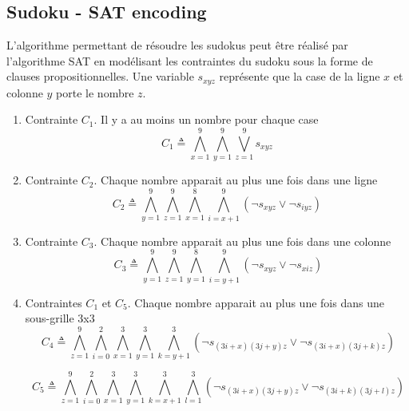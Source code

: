 \subsection{Sudoku - SAT encoding}
L'algorithme permettant de résoudre les sudokus peut être réalisé par l'algorithme SAT en modélisant
les contraintes du sudoku sous la forme de clauses propositionnelles. Une variable $s_{xyz}$ représente que la
case de la ligne $x$ et colonne $y$ porte le nombre $z$.
\begin{enumerate}
	\item Contrainte $C_1$. Il y a au moins un nombre pour chaque case 
	$$ C_1 \triangleq \bigwedge _{x=1}^9  \bigwedge _{y=1}^9 \bigvee  _{z=1}^9 s_{xyz}$$

	\item Contrainte $C_2$.  Chaque nombre apparait au plus une fois dans une ligne
	$$  C_2 \triangleq \bigwedge _{y=1}^9  \bigwedge _{z=1}^9 \bigwedge _{x=1}^8 \bigwedge _{i=x+1}^9  ( \lnot s_{xyz} \vee \lnot s_{iyz} ) $$

	\item  Contrainte $C_3$. Chaque nombre apparait au plus une fois dans une colonne
	$$ \ C_3 \triangleq \bigwedge _{y=1}^9  \bigwedge _{z=1}^9 \bigwedge _{y=1}^8 \bigwedge _{i=y+1}^9  ( \lnot s_{xyz} \vee \lnot s_{xiz} ) $$

	\item  Contraintes $C_1$ et $C_5$. Chaque nombre apparait au plus une fois dans une sous-grille 3x3
	$$ \ C_4 \triangleq \bigwedge _{z=1}^9  \bigwedge _{i=0}^2 \bigwedge _{x=1}^3
	 \bigwedge _{y=1}^3  \bigwedge _{k=y+1}^3  ( \lnot s_{(3i+x)(3j+y)z} \vee \lnot s_{(3i+x)(3j+k)z} ) $$

	$$ \ C_5 \triangleq \bigwedge _{z=1}^9  \bigwedge _{i=0}^2 \bigwedge _{x=1}^3
	 \bigwedge _{y=1}^3  \bigwedge _{k=x+1}^3  \bigwedge _{l=1}^3  ( \lnot s_{(3i+x)(3j+y)z} \vee \lnot s_{(3i+k)(3j+l)z} ) $$
\end{enumerate}
